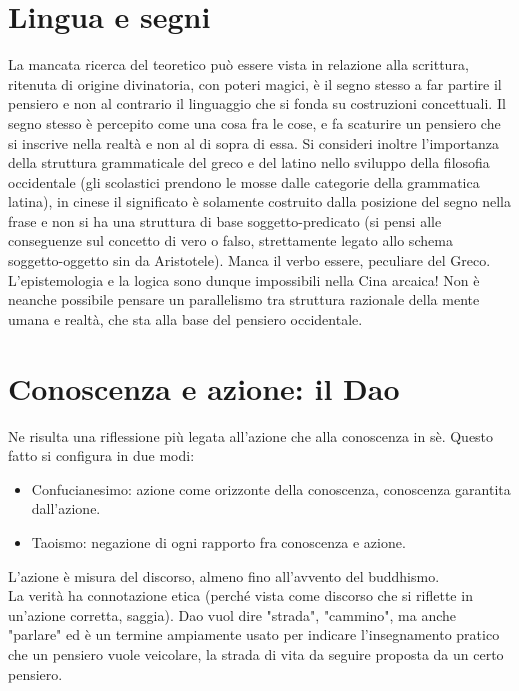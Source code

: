 \documentclass[10pt,a4paper]{report}
\begin{document}
\section{Lingua e segni}
La mancata ricerca del teoretico può essere vista in relazione alla scrittura, ritenuta di origine divinatoria, con poteri magici, è il segno stesso a far partire il pensiero e non al contrario il linguaggio che si fonda su costruzioni concettuali. Il segno stesso è percepito come una cosa fra le cose, e fa scaturire un pensiero che si inscrive nella realtà e non al di sopra di essa. Si consideri inoltre l'importanza della struttura grammaticale del greco e del latino nello sviluppo della filosofia occidentale (gli scolastici prendono le mosse dalle categorie della grammatica latina), in cinese il significato è solamente costruito dalla posizione del segno nella frase e non si ha una struttura di base soggetto-predicato (si pensi alle conseguenze sul concetto di vero o falso, strettamente legato allo schema soggetto-oggetto sin da Aristotele). Manca il verbo essere, peculiare del Greco. L'epistemologia e la logica sono dunque impossibili nella Cina arcaica! Non è neanche possibile pensare un parallelismo tra struttura razionale della mente umana e realtà, che sta alla base del pensiero occidentale.
\section{Conoscenza e azione: il Dao}
Ne risulta una riflessione più legata all'azione che alla conoscenza in sè. Questo fatto si configura in due modi: 
\begin{itemize}
	\item Confucianesimo: azione come orizzonte della conoscenza, conoscenza garantita dall'azione. 
	\item Taoismo: negazione di ogni rapporto fra conoscenza e azione. 
\end{itemize}
L'azione è misura del discorso, almeno fino all'avvento del buddhismo.\\
La verità ha connotazione etica (perché vista come discorso che si riflette in un'azione corretta, saggia). Dao vuol dire "strada", "cammino", ma anche "parlare" ed è un termine ampiamente usato per indicare l'insegnamento pratico che un pensiero vuole veicolare, la strada di vita da seguire proposta da un certo pensiero.
\end{document}

